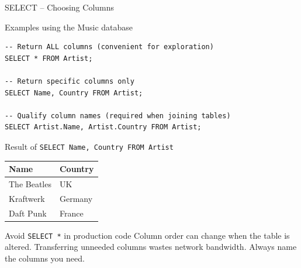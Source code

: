 \begin{frame}[fragile]{SELECT -- Choosing Columns}
  \begin{block}{Examples using the Music database}
\begin{lstlisting}[style=sqlstyle]
-- Return ALL columns (convenient for exploration)
SELECT * FROM Artist;

-- Return specific columns only
SELECT Name, Country FROM Artist;

-- Qualify column names (required when joining tables)
SELECT Artist.Name, Artist.Country FROM Artist;
\end{lstlisting}
  \end{block}

  \begin{block}{Result of \texttt{SELECT Name, Country FROM Artist}}
    \begin{tabular}{@{}ll@{}}
      \toprule
      \textbf{Name} & \textbf{Country} \\
      \midrule
      The Beatles & UK \\
      Kraftwerk   & Germany \\
      Daft Punk   & France \\
      \bottomrule
    \end{tabular}
  \end{block}

  \begin{alertblock}{Avoid \texttt{SELECT *} in production code}
    Column order can change when the table is altered. Transferring unneeded
    columns wastes network bandwidth. Always name the columns you need.
  \end{alertblock}
\end{frame}

